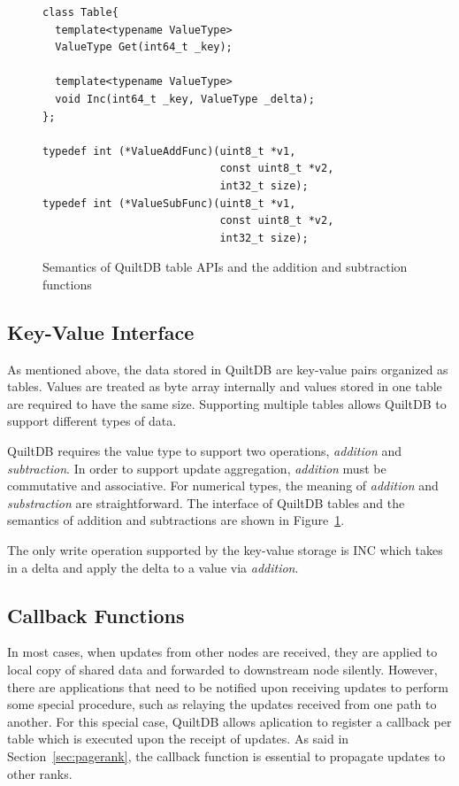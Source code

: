 \documentclass{acm_proc_article-sp}
\begin{document}
\begin{figure}[th!]
\begin{verbatim}
class Table{
  template<typename ValueType>
  ValueType Get(int64_t _key);
  
  template<typename ValueType>
  void Inc(int64_t _key, ValueType _delta);
};

typedef int (*ValueAddFunc)(uint8_t *v1, 
                            const uint8_t *v2,
                            int32_t size);
typedef int (*ValueSubFunc)(uint8_t *v1, 
                            const uint8_t *v2,
                            int32_t size);

\end{verbatim}
\caption{Semantics of QuiltDB table APIs and the addition and subtraction 
  functions}
\label{fig:table-api}
\end{figure}

\subsection{Key-Value Interface}

As mentioned above, the data stored in QuiltDB are key-value pairs organized 
as tables. Values are treated as byte array internally and values stored in one 
table are required to have the same size. Supporting multiple tables allows 
QuiltDB to support different types of data.

QuiltDB requires the value type to support two operations, \emph{addition} and 
\emph{subtraction}. In order to support update aggregation, \emph{addition} must
 be commutative and associative. For numerical types,  the meaning of 
\emph{addition} and \emph{substraction} are straightforward. The interface of 
QuiltDB tables and the semantics of addition and subtractions are shown in
Figure~\ref{fig:table-api}.

The only write operation supported by the key-value storage is INC which takes 
in a delta and apply the delta to a value via \emph{addition}.

\subsection{Callback Functions}
\label{sec:callback}

In most cases, when updates from other nodes are received, they are applied to 
local copy of shared data and forwarded to downstream node silently. 
However, there are applications that need to be notified upon receiving updates 
to perform some special procedure, such as relaying the updates received from 
one path to another. For this special case, QuiltDB allows aplication to 
register a callback per table which is executed upon the receipt of updates. As 
said in Section~\ref{sec:pagerank}, the callback function is essential to 
propagate updates to other ranks.
\end{document}
